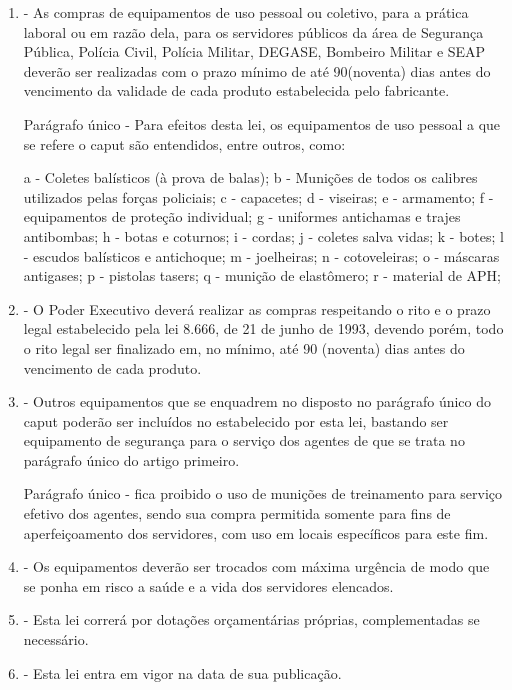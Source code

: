 \documentclass[10pt]{article}
\begin{document}
\begin{enumerate}[label=Art. \arabic*\textdegree]
\item - As compras de equipamentos de uso pessoal ou coletivo, para a prática laboral ou em razão dela, para os servidores públicos da área de Segurança Pública, Polícia Civil, Polícia Militar, DEGASE,  Bombeiro Militar e SEAP deverão ser realizadas com o prazo mínimo de até 90(noventa) dias antes do vencimento da validade de cada produto estabelecida pelo fabricante.

Parágrafo único - Para efeitos desta lei, os equipamentos de uso pessoal a que se refere o caput são entendidos, entre outros, como:

a - Coletes balísticos (à prova de balas);
b - Munições de todos os calibres utilizados pelas forças policiais;
c - capacetes;
d - viseiras;
e - armamento;
f - equipamentos de proteção individual;
g - uniformes antichamas e trajes antibombas;
h - botas e coturnos;
i - cordas;
j - coletes salva vidas;
k - botes;
l - escudos balísticos e antichoque;
m - joelheiras;
n - cotoveleiras;
o - máscaras antigases;
p - pistolas tasers;
q - munição de elastômero;
r - material de APH;

\item - O Poder Executivo deverá realizar as compras respeitando o rito e o prazo legal estabelecido pela lei 8.666, de 21 de junho de 1993, devendo porém, todo o rito legal ser finalizado em, no mínimo, até 90 (noventa) dias antes do vencimento de cada produto.

\item - Outros equipamentos que se enquadrem no disposto no parágrafo único do caput poderão ser incluídos no estabelecido por esta lei, bastando ser equipamento de segurança para o serviço dos agentes de que se trata no parágrafo único do artigo primeiro.

Parágrafo único - fica proibido o uso de munições de treinamento para serviço efetivo dos agentes, sendo sua compra permitida somente para fins de aperfeiçoamento dos servidores, com uso em locais específicos para este fim.

\item - Os equipamentos deverão ser trocados com máxima urgência de modo que se ponha em risco a saúde e a vida dos servidores elencados.

\item - Esta lei correrá por dotações orçamentárias próprias, complementadas se necessário.

\item - Esta lei entra em vigor na data de sua publicação.

\end{enumerate}
\end{document}
